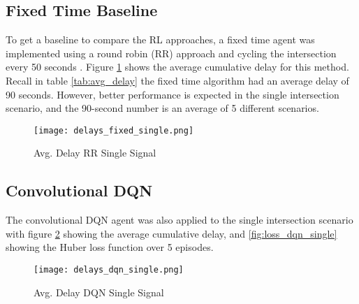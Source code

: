 \documentclass[letterpaper]{article} %
\begin{document}
\subsection{Fixed Time Baseline}
To get a baseline to compare the RL approaches, a fixed time agent was implemented using a round robin (RR) approach and cycling the intersection every 50 seconds \cite{Chaudhuri2021}.
Figure \ref{fig:delays_fixed_single} shows the average cumulative delay for this method.
Recall in table \ref{tab:avg_delay} the fixed time algorithm had an average delay of 90 seconds.
However, better performance is expected in the single intersection scenario, and the 90-second number is an average of 5 different scenarios.

\begin{figure}[htbp]
  \centering
  \texttt{[image: delays\_fixed\_single.png]}
  \caption{Avg. Delay RR Single Signal}
  \label{fig:delays_fixed_single}
\end{figure}


\subsection{Convolutional DQN}
The convolutional DQN agent was also applied to the single intersection scenario with figure \ref{fig:delays_dqn_single} showing the average cumulative delay,
and \ref{fig:loss_dqn_single} showing the Huber loss function over 5 episodes.

\begin{figure}[htbp]
  \centering
  \texttt{[image: delays\_dqn\_single.png]}
  \caption{Avg. Delay DQN Single Signal}
  \label{fig:delays_dqn_single}
\end{figure}

\end{document}
